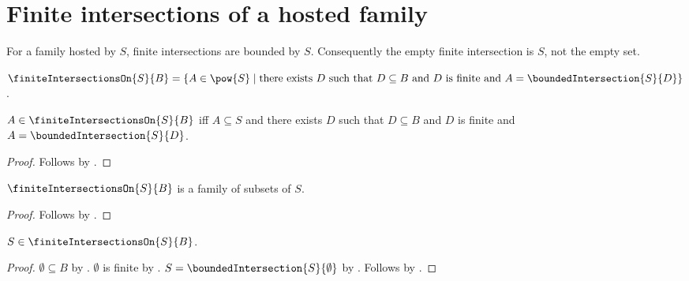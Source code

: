 \section{Finite intersections of a hosted family}





For a family hosted by $S$, finite intersections are bounded by $S$.
Consequently the empty finite intersection is $S$, not the empty set.

\begin{definition}\label{finite_intersections_on}
    $\finiteIntersectionsOn{S}{B}
        =\{A\in\pow{S}\mid
            \text{there exists $D$ such that $D\subseteq B$ and
                $D$ is finite and
                $A=\boundedIntersection{S}{D}$}\}$.
\end{definition}

\begin{proposition}\label{finite_intersections_on_iff}
    $A\in\finiteIntersectionsOn{S}{B}$ iff
        $A\subseteq S$ and there exists $D$ such that
            $D\subseteq B$ and $D$ is finite and
            $A=\boundedIntersection{S}{D}$.
\end{proposition}
\begin{proof}
    Follows by .
\end{proof}

\begin{proposition}\label{finite_intersections_on_type}
    $\finiteIntersectionsOn{S}{B}$ is a family of subsets of $S$.
\end{proposition}
\begin{proof}
    Follows by
        .
\end{proof}

\begin{proposition}\label{carrier_in_finite_intersections_on}
    $S\in\finiteIntersectionsOn{S}{B}$.
\end{proposition}
\begin{proof}
    $\emptyset\subseteq B$ by .
    $\emptyset$ is finite by .
    $S=\boundedIntersection{S}{\emptyset}$ by
        .
    Follows by .
\end{proof}


